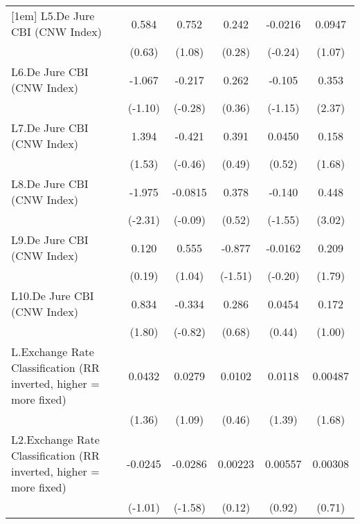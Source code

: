 {\begin{longtable}{l*{5}{c}}
[1em]
L5.De Jure CBI (CNW Index)&    0.584         &    0.752         &    0.242         &  -0.0216         &   0.0947         \\
                &   (0.63)         &   (1.08)         &   (0.28)         &  (-0.24)         &   (1.07)         \\
[1em]
L6.De Jure CBI (CNW Index)&   -1.067         &   -0.217         &    0.262         &   -0.105         &    0.353\sym{*}  \\
                &  (-1.10)         &  (-0.28)         &   (0.36)         &  (-1.15)         &   (2.37)         \\
[1em]
L7.De Jure CBI (CNW Index)&    1.394         &   -0.421         &    0.391         &   0.0450         &    0.158         \\
                &   (1.53)         &  (-0.46)         &   (0.49)         &   (0.52)         &   (1.68)         \\
[1em]
L8.De Jure CBI (CNW Index)&   -1.975\sym{*}  &  -0.0815         &    0.378         &   -0.140         &    0.448\sym{**} \\
                &  (-2.31)         &  (-0.09)         &   (0.52)         &  (-1.55)         &   (3.02)         \\
[1em]
L9.De Jure CBI (CNW Index)&    0.120         &    0.555         &   -0.877         &  -0.0162         &    0.209         \\
                &   (0.19)         &   (1.04)         &  (-1.51)         &  (-0.20)         &   (1.79)         \\
[1em]
L10.De Jure CBI (CNW Index)&    0.834         &   -0.334         &    0.286         &   0.0454         &    0.172         \\
                &   (1.80)         &  (-0.82)         &   (0.68)         &   (0.44)         &   (1.00)         \\
[1em]
L.Exchange Rate Classification (RR inverted, higher = more fixed)&   0.0432         &   0.0279         &   0.0102         &   0.0118         &  0.00487         \\
                &   (1.36)         &   (1.09)         &   (0.46)         &   (1.39)         &   (1.68)         \\
[1em]
L2.Exchange Rate Classification (RR inverted, higher = more fixed)&  -0.0245         &  -0.0286         &  0.00223         &  0.00557         &  0.00308         \\
                &  (-1.01)         &  (-1.58)         &   (0.12)         &   (0.92)         &   (0.71)         \\

\end{longtable}}
